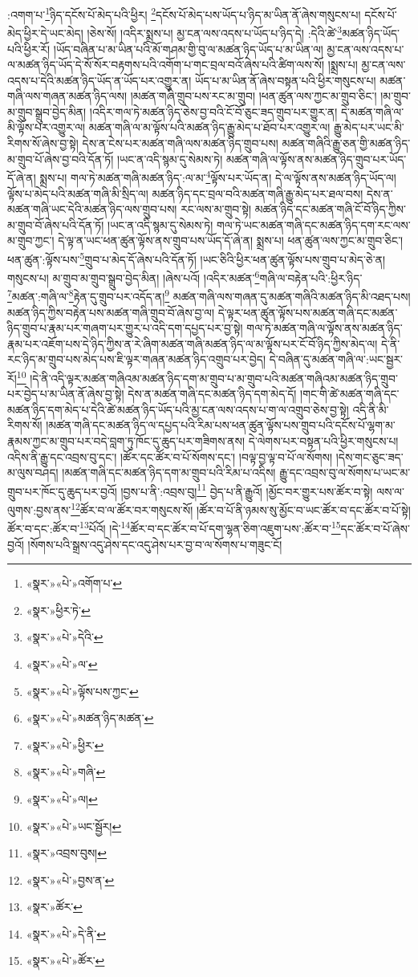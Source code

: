 :འགག་པ་\footnote{«སྣར་»«པེ་»འགོག་པ་}ཉིད་དངོས་པོ་མེད་པའི་ཕྱིར། \footnote{«སྣར་»ཕྱིར་ཏེ་}དངོས་པོ་མེད་པས་ཡོད་པ་ཉིད་མ་ཡིན་ནོ་ཞེས་གསུངས་པ། དངོས་པོ་མེད་ཕྱིར་དེ་ཡང་མེད། །ཅེས་སོ། །འདིར་སྨྲས་པ། མྱ་ངན་ལས་འདས་པ་ཡོད་པ་ཉིད་དེ། :དེའི་ཚེ་\footnote{«སྣར་»«པེ་»དེའི་}མཚན་ཉིད་ཡོད་པའི་ཕྱིར་རོ། །ཡོད་བཞིན་པ་མ་ཡིན་པའི་མོ་གཤམ་གྱི་བུ་ལ་མཚན་ཉིད་ཡོད་པ་མ་ཡིན་ལ། མྱ་ངན་ལས་འདས་པ་ལ་མཚན་ཉིད་ཡོད་དེ་སོ་སོར་བརྟགས་པའི་འགོག་པ་གང་བྲལ་བའོ་ཞེས་པའི་ཚིག་ལས་སོ། །སྨྲས་པ། མྱ་ངན་ལས་འདས་པ་དེའི་མཚན་ཉིད་ཡོད་ན་ཡོད་པར་འགྱུར་ན། ཡོད་པ་མ་ཡིན་ནོ་ཞེས་བསྟན་པའི་ཕྱིར་གསུངས་པ། མཚན་གཞི་ལས་གཞན་མཚན་ཉིད་ལས། །མཚན་གཞི་གྲུབ་པས་རང་མ་གྲུབ། །ཕན་ཚུན་ལས་ཀྱང་མ་གྲུབ་ཅིང་། །མ་གྲུབ་མ་གྲུབ་སྒྲུབ་བྱེད་མིན། །འདིར་གལ་ཏེ་མཚན་ཉིད་ཅེས་བྱ་བའི་ངོ་བོ་ཅུང་ཟད་གྲུབ་པར་གྱུར་ན། དེ་མཚན་གཞི་ལ་མི་ལྟོས་པར་འགྱུར་ལ། མཚན་གཞི་ལ་མ་ལྟོས་པའི་མཚན་ཉིད་རྒྱུ་མེད་པ་ཐོབ་པར་འགྱུར་ལ། རྒྱུ་མེད་པར་ཡང་མི་རིགས་སོ་ཞེས་བྱ་སྟེ། དེས་ན་ངེས་པར་མཚན་གཞི་ལས་མཚན་ཉིད་གྲུབ་པས། མཚན་གཞིའི་རྒྱུ་ཅན་གྱི་མཚན་ཉིད་མ་གྲུབ་པོ་ཞེས་བྱ་བའི་དོན་ཏོ། །ཡང་ན་འདི་སྙམ་དུ་སེམས་ཏེ། མཚན་གཞི་ལ་ལྟོས་ནས་མཚན་ཉིད་གྲུབ་པར་ཡོད་དོ་ཞེ་ན། སྨྲས་པ། གལ་ཏེ་མཚན་གཞི་མཚན་ཉིད་:ལ་མ་\footnote{«སྣར་»«པེ་»ལ་}ལྟོས་པར་ཡོད་ན། དེ་ལ་ལྟོས་ནས་མཚན་ཉིད་ཡོད་ལ། ལྟོས་པ་མེད་པའི་མཚན་གཞི་མི་སྲིད་ལ། མཚན་ཉིད་དང་བྲལ་བའི་མཚན་གཞི་རྒྱུ་མེད་པར་ཐལ་བས། དེས་ན་མཚན་གཞི་ཡང་དེའི་མཚན་ཉིད་ལས་གྲུབ་པས། རང་ལས་མ་གྲུབ་སྟེ། མཚན་ཉིད་དང་མཚན་གཞི་ངོ་བོ་ཉིད་ཀྱིས་མ་གྲུབ་བོ་ཞེས་པའི་དོན་ཏོ། །ཡང་ན་འདི་སྙམ་དུ་སེམས་ཏེ། གལ་ཏེ་ཡང་མཚན་གཞི་དང་མཚན་ཉིད་དག་རང་ལས་མ་གྲུབ་ཀྱང་། དེ་ལྟ་ན་ཡང་ཕན་ཚུན་ལྟོས་ནས་གྲུབ་པས་ཡོད་དོ་ཞེ་ན། སྨྲས་པ། ཕན་ཚུན་ལས་ཀྱང་མ་གྲུབ་ཅིང་། ཕན་ཚུན་:ལྟོས་པས་\footnote{«སྣར་»«པེ་»ལྟོས་པས་ཀྱང་}གྲུབ་པ་མེད་དོ་ཞེས་པའི་དོན་ཏོ། །ཡང་ཅིའི་ཕྱིར་ཕན་ཚུན་ལྟོས་པས་གྲུབ་པ་མེད་ཅེ་ན། གསུངས་པ། མ་གྲུབ་མ་གྲུབ་སྒྲུབ་བྱེད་མིན། །ཞེས་པའོ། །འདིར་མཚན་\footnote{«སྣར་»«པེ་»མཚན་ཉིད་མཚན་}གཞི་ལ་བརྟེན་པའི་:ཕྱིར་ཉིད་\footnote{«སྣར་»«པེ་»ཕྱིར་}མཚན་:གཞི་ལ་\footnote{«སྣར་»«པེ་»གཞི་}རྟེན་དུ་གྲུབ་པར་འདོད་ན།\footnote{«སྣར་»«པེ་»ལ།} མཚན་གཞི་ལས་གཞན་དུ་མཚན་གཞིའི་མཚན་ཉིད་མི་འཐད་པས། མཚན་ཉིད་ཀྱིས་བརྟེན་པས་མཚན་གཞི་གྲུབ་བོ་ཞེས་བྱ་ལ། དེ་ལྟར་ཕན་ཚུན་ལྟོས་པས་མཚན་གཞི་དང་མཚན་ཉིད་གྲུབ་པ་རྣམ་པར་གཞག་པར་གྱུར་པ་འདི་དག་དཔྱད་པར་བྱ་སྟེ། གལ་ཏེ་མཚན་གཞི་ལ་ལྟོས་ནས་མཚན་ཉིད་རྣམ་པར་འཇོག་པས་དེ་ཉིད་ཀྱིས་ན་རེ་ཞིག་མཚན་གཞི་མཚན་ཉིད་ལ་མ་ལྟོས་པར་ངོ་བོ་ཉིད་ཀྱིས་མེད་ལ། དེ་ནི་རང་ཉིད་མ་གྲུབ་པས་མེད་པས་ཇི་ལྟར་གཞན་མཚན་ཉིད་འགྲུབ་པར་བྱེད། དེ་བཞིན་དུ་མཚན་གཞི་ལ་:ཡང་སྦྱར་རོ།\footnote{«སྣར་»«པེ་»ཡང་སྦྱོར།} །དེ་ནི་འདི་ལྟར་མཚན་གཞིའམ་མཚན་ཉིད་དག་མ་གྲུབ་པ་མ་གྲུབ་པའི་མཚན་གཞིའམ་མཚན་ཉིད་གྲུབ་པར་བྱེད་པ་མ་ཡིན་ནོ་ཞེས་བྱ་སྟེ། དེས་ན་མཚན་གཞི་དང་མཚན་ཉིད་དག་མེད་དོ། །གང་གི་ཚེ་མཚན་གཞི་དང་མཚན་ཉིད་དག་མེད་པ་དེའི་ཚེ་མཚན་ཉིད་ཡོད་པའི་མྱ་ངན་ལས་འདས་པ་ག་ལ་འགྲུབ་ཅེས་བྱ་སྟེ། འདི་ནི་མི་རིགས་སོ། །མཚན་གཞི་དང་མཚན་ཉིད་ལ་དཔྱད་པའི་རིམ་པས་ཕན་ཚུན་ལྟོས་པས་གྲུབ་པའི་དངོས་པོ་ལྷག་མ་རྣམས་ཀྱང་མ་གྲུབ་པར་བདེ་བླག་ཏུ་ཁོང་དུ་ཆུད་པར་གཟིགས་ནས། དེ་ལེགས་པར་བསྟན་པའི་ཕྱིར་གསུངས་པ། འདིས་ནི་རྒྱུ་དང་འབྲས་བུ་དང་། །ཚོར་དང་ཚོར་བ་པོ་སོགས་དང་། །བལྟ་བྱ་ལྟ་བ་པོ་ལ་སོགས། །དེས་གང་ཅུང་ཟད་མ་ལུས་བཤད། །མཚན་གཞི་དང་མཚན་ཉིད་དག་མ་གྲུབ་པའི་རིམ་པ་འདིས། རྒྱུ་དང་འབྲས་བུ་ལ་སོགས་པ་ཡང་མ་གྲུབ་པར་ཁོང་དུ་ཆུད་པར་བྱའོ། །བྱས་པ་ནི་:འབྲས་བུ།\footnote{«སྣར་»འབྲས་བུས།} བྱེད་པ་ནི་རྒྱུའོ། །མྱོང་བར་གྱུར་པས་ཚོར་བ་སྟེ། ལས་ལ་ལུགས་:བྱས་ནས་\footnote{«སྣར་»«པེ་»བྱས་ན་}ཚོར་བ་ལ་ཚོར་བར་གསུངས་སོ། །ཚོར་བ་པོ་ནི་ཉམས་སུ་མྱོང་བ་ཡང་ཚོར་བ་དང་ཚོར་བ་པོ་སྟེ། ཚོར་བ་དང་:ཚོར་བ་\footnote{«སྣར་»ཚོར་}པོའོ། །དེ་\footnote{«སྣར་»«པེ་»དེ་ནི་}ཚོར་བ་དང་ཚོར་བ་པོ་དག་ལྷན་ཅིག་འཇུག་པས་:ཚོར་བ་\footnote{«སྣར་»«པེ་»ཚོར་}དང་ཚོར་བ་པོ་ཞེས་བྱའོ། །སོགས་པའི་སྒྲས་འདུ་ཤེས་དང་འདུ་ཤེས་པར་བྱ་བ་ལ་སོགས་པ་གཟུང་ངོ། 